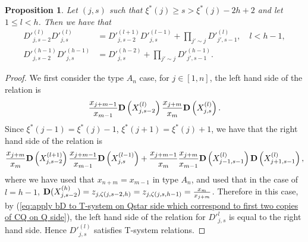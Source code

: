 \documentclass[12pt]{amsart}
\theoremstyle{plain}
\newtheorem{proposition}[theorem]{Proposition}
\theoremstyle{definition}
\numberwithin{equation}{section}
\newcommand{\xistar}{\xi^{*}}
\begin{document}
\begin{proposition} \label{prop : T-systems}
    Let $(j,s)$ such that $\xistar(j) \geq s > \xistar(j)-2h+2$ and let $1 \leq l < h$. Then we have that
\begin{align*}
  {D'}_{j,s-2}^{(l)} {D'}_{j,s}^{(l)} &= {D'}_{j,s-2}^{(l+1)} {D'}_{j,s}^{(l-1)} + \prod_{j' \sim j} {D'}_{j',s-1}^{(l)}, \quad l<h-1, \\
{D'}_{j,s-2}^{(h-1)} {D'}_{j,s}^{(h-1)} &=  {D'}_{j,s}^{(h-2)} + \prod_{j' \sim j} {D'}_{j',s-1}^{(h-1)}.
\end{align*}    
    \end{proposition}
    
\begin{proof}





We first consider the type $A_n$ case, for $j \in [1,n]$, the left hand side of the relation is
\begin{align*}
\frac{x_{j+m-1}}{x_{m-1}} {\bf D}\left( X_{j,s-2}^{(l)} \right) \frac{x_{j+m}}{x_{m}} {\bf D}\left( X_{j,s}^{(l)} \right). 
\end{align*}
Since $\xi^*(j-1) = \xi^*(j)-1$, $\xi^*(j+1) = \xi^*(j)+1$, we have that the right hand side of the relation is 
\begin{align*}
\frac{x_{j+m}}{x_{m}} {\bf D}\left( X_{j,s-2}^{(l+1)} \right) \frac{x_{j+m-1}}{x_{m-1}} {\bf D}\left( X_{j,s}^{(l-1)} \right) + \frac{x_{j+m-1}}{x_{m}} \frac{x_{j+m}}{x_{m-1}} {\bf D}\left( X_{j-1,s-1}^{(l)} \right)  {\bf D}\left( X_{j+1,s-1}^{(l)} \right),
\end{align*}
where we have used that $x_{n+m}=x_{m-1}$ in type $A_n$, and used that in the case of $l=h-1$, ${\bf D}(X_{j,s-2}^{(h)}) = z_{j, \zeta(j,s-2,h)} = z_{j, \zeta(j,s,h-1)} = \frac{x_m}{x_{j+m}}$.  
Therefore in this case, by (\ref{eq:apply bD to T-system on Qstar side which correspond to first two copies of CQ on Q side}), the left hand side of the relation for ${D'}_{j,s}^{l}$ is equal to the right hand side. Hence ${D'}_{j,s}^{(l)}$ satisfies T-system relations.


\end{proof}
\end{document}
